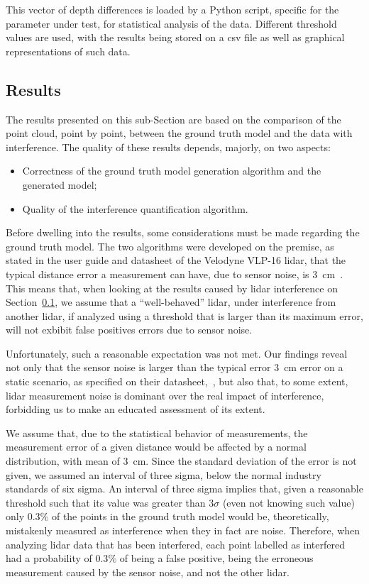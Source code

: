 This vector of depth differences is loaded by a Python script, specific for the parameter under test, for statistical analysis of the data. Different threshold values are used, with the results being stored on a \ac{csv} file as well as graphical representations of such data. 

\subsection{Results}
\label{subsec:lidar-interference:point-to-point-analysis-results}
The results presented on this sub-Section are based on the comparison of the point cloud, point by point, between the ground truth model and the data with interference. The quality of these results depends, majorly, on two aspects:

\begin{itemize}
\item Correctness of the ground truth model generation algorithm and the generated model;
\item Quality of the interference quantification algorithm.
\end{itemize}

Before dwelling into the results, some considerations must be made regarding the ground truth model. The two algorithms were developed on the premise, as stated in the user guide and datasheet of the Velodyne VLP-16 \ac{lidar}, that the typical distance error a measurement can have, due to sensor noise, is \SI{3}{\centi\meter}~\cite{VLP16}. This means that, when looking at the results caused by \ac{lidar} interference on Section~\ref{subsec:lidar-interference:point-to-point-analysis-results}, we assume that a ``well-behaved'' \ac{lidar}, under interference from another \ac{lidar}, if analyzed using a threshold that is larger than its maximum error, will not exbibit false positives errors due to sensor noise.

Unfortunately, such a reasonable expectation was not met. Our findings reveal not only that the sensor noise is larger than the typical error \SI{3}{\centi\meter} error on a static scenario, as specified on their datasheet,~\cite{VLP16}, but also that, to some extent, \ac{lidar} measurement noise is dominant over the real impact of interference, forbidding us to make an educated assessment of its extent.

We assume that, due to the statistical behavior of measurements, the measurement error of a given distance would be affected by a normal distribution, with mean of \SI{3}{\centi\meter}. Since the standard deviation of the error is not given, we assumed an interval of three sigma, below the normal industry standards of six sigma. An interval of three sigma implies that, given a reasonable threshold such that its value was greater than $3\sigma$ (even not knowing such value) only 0.3\% of the points in the ground truth model would be, theoretically, mistakenly measured as interference when they in fact are noise. Therefore, when analyzing \ac{lidar} data that has been interfered, each point labelled as interfered had a probability of $0.3\%$ of being a false positive, being the erroneous measurement caused by the sensor noise, and not the other \ac{lidar}.

